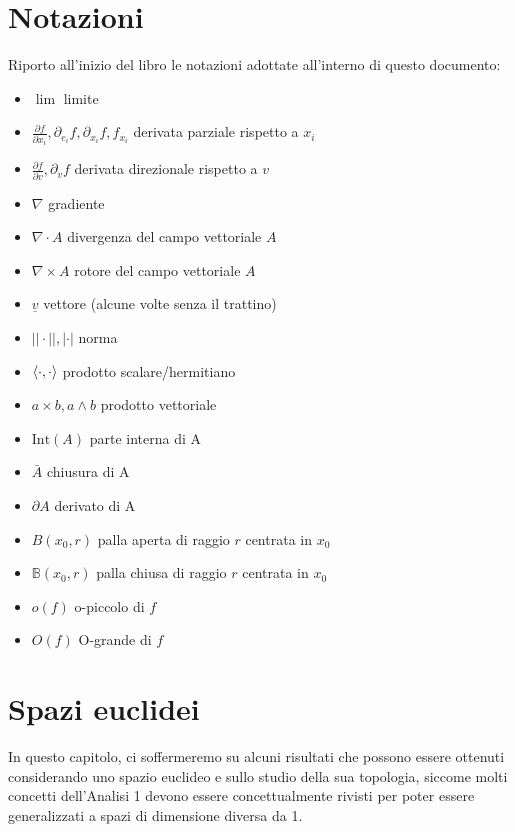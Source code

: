 \documentclass[openany]{book}
\begin{document}
	\chapter*{Notazioni}
	Riporto all'inizio del libro le notazioni adottate all'interno di questo documento:
	\begin{itemize}[label=\hspace{-0.5em}]
		\item $\lim$ limite		
		\item $\frac{\partial f}{\partial x_i}, \partial_{e_i} f, \partial_{x_i} f, f_{x_i}$ derivata parziale rispetto a $x_i$
		\item $\frac{\partial f}{\partial v}, \partial_v f$ derivata direzionale rispetto a $v$
		\item $\nabla$ gradiente
		\item $\nabla \cdot A$ divergenza del campo vettoriale $A$
		\item $\nabla \times A$ rotore del campo vettoriale $A$
		\item $\underline{v}$ vettore (alcune volte senza il trattino)
		\item $||\cdot||, |\cdot|$ norma
		\item $\langle \cdot, \cdot \rangle$ prodotto scalare/hermitiano
		\item $a \times b, a \wedge b$ prodotto vettoriale
		\item $\text{Int}(A)$ parte interna di A
		\item $\bar{A}$ chiusura di A
		\item $\partial A$ derivato di A
		\item $B(x_0, r)$ palla aperta di raggio $r$ centrata in $x_0$
		\item $\mathbb{B}(x_0, r)$ palla chiusa di raggio $r$ centrata in $x_0$
		\item $o(f)$ o-piccolo di $f$
		\item $O(f)$ O-grande di $f$
	\end{itemize}
	\chapter{Spazi euclidei}
	In questo capitolo, ci soffermeremo su alcuni risultati che possono essere ottenuti considerando uno spazio euclideo e sullo studio della sua topologia, siccome molti concetti dell'Analisi 1 devono essere concettualmente rivisti per poter essere generalizzati a spazi di dimensione diversa da 1.
\end{document}
